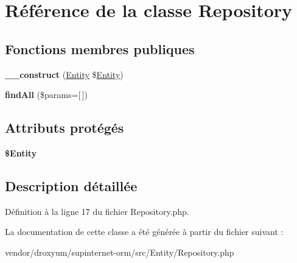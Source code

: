 \hypertarget{class_o_r_m_1_1_entity_1_1_repository}{}\section{Référence de la classe Repository}
\label{class_o_r_m_1_1_entity_1_1_repository}
\subsection*{Fonctions membres publiques}
\begin{DoxyCompactItemize}
\item 
{\bfseries \+\_\+\+\_\+construct} (\hyperlink{class_o_r_m_1_1_entity_1_1_entity}{Entity} \$\hyperlink{class_o_r_m_1_1_entity_1_1_entity}{Entity})\hypertarget{class_o_r_m_1_1_entity_1_1_repository_a4e25e300f859c6f7f40fa4e494c8279d}{}\label{class_o_r_m_1_1_entity_1_1_repository_a4e25e300f859c6f7f40fa4e494c8279d}

\item 
{\bfseries find\+All} (\$params=\mbox{[}$\,$\mbox{]})\hypertarget{class_o_r_m_1_1_entity_1_1_repository_a459bb09797db65a733ec0da33c0eee68}{}\label{class_o_r_m_1_1_entity_1_1_repository_a459bb09797db65a733ec0da33c0eee68}

\end{DoxyCompactItemize}
\subsection*{Attributs protégés}
\begin{DoxyCompactItemize}
\item 
{\bfseries \$\+Entity}\hypertarget{class_o_r_m_1_1_entity_1_1_repository_aca18b058e8207b5d1deba2d033296001}{}\label{class_o_r_m_1_1_entity_1_1_repository_aca18b058e8207b5d1deba2d033296001}

\end{DoxyCompactItemize}


\subsection{Description détaillée}


Définition à la ligne 17 du fichier Repository.\+php.



La documentation de cette classe a été générée à partir du fichier suivant \+:\begin{DoxyCompactItemize}
\item 
vendor/droxyum/supinternet-\/orm/src/\+Entity/Repository.\+php\end{DoxyCompactItemize}
